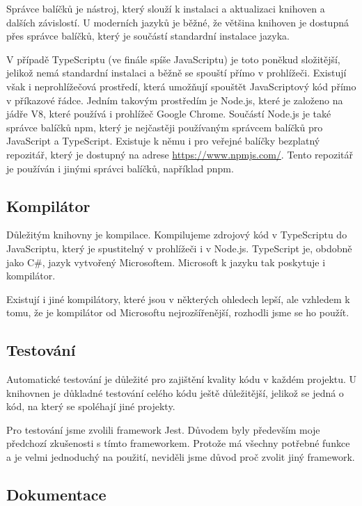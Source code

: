 Správce balíčků je nástroj, který slouží k instalaci a aktualizaci knihoven a dalších závislostí. 
U moderních jazyků je běžné, že většina knihoven je dostupná přes správce balíčků, který je součástí standardní instalace jazyka.

V případě TypeScriptu (ve finále spíše JavaScriptu) je toto poněkud složitější, jelikož nemá standardní instalaci a běžně se spouští přímo v prohlížeči.
Existují však i neprohlížečová prostředí, která umožňují spouštět JavaScriptový kód přímo v příkazové řádce. 
Jedním takovým prostředím je Node.js, které je založeno na jádře V8, které používá i prohlížeč Google Chrome.
Součástí Node.js je také správce balíčků npm, který je nejčastěji používaným správcem balíčků pro JavaScript a TypeScript. 
Existuje k němu i pro veřejné balíčky bezplatný repozitář, který je dostupný na adrese \url{https://www.npmjs.com/}.
Tento repozitář je používán i jinými správci balíčků, například pnpm.

\subsection{Kompilátor}
\label{subsec:compiler}

Důležitým  knihovny je kompilace. 
Kompilujeme zdrojový kód v TypeScriptu do JavaScriptu, který je spustitelný v prohlížeči i v Node.js. 
TypeScript je, obdobně jako C\#, jazyk vytvořený Microsoftem.
Microsoft k jazyku tak poskytuje i kompilátor.

Existují i jiné kompilátory, které jsou v některých ohledech lepší, ale vzhledem k tomu, že je kompilátor od Microsoftu nejrozšířenější, rozhodli jsme se ho použít.

\subsection{Testování}
\label{subsec:testing}

Automatické testování je důležité pro zajištění kvality kódu v každém projektu. 
U knihovnen je důkladné testování celého kódu ještě důležitější, jelikož se jedná o kód, na který se spoléhají jiné projekty.

Pro testování jsme zvolili framework Jest.
Důvodem byly především moje předchozí zkušenosti s tímto frameworkem.
Protože má všechny potřebné funkce a je velmi jednoduchý na použití, neviděli jsme důvod proč zvolit jiný framework.

\subsection{Dokumentace}
\label{subsec:documentation}


